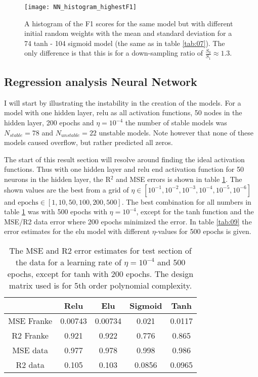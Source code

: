 \documentclass[uio,jmp,amsmath,amssymb,reprint,nofootinbib]{revtex4-1}
\numberwithin{equation}{section}
\begin{document}
\begin{figure}[H]
    \centering
    \texttt{[image: NN\_histogram\_highestF1]}
    \caption{A histogram of the F1 scores for the same model but with different initial random weights with the mean and standard deviation for a 74 tanh - 104 sigmoid model (the same as in table \ref{tab:07}). The only difference is that this is for a down-sampling ratio of \(\frac{S_0}{S_1}\approx 1.3\).}
    \label{fig:10}
\end{figure}


\subsection{Regression analysis Neural Network}\label{sec:reg_NN}

I will start by illustrating the instability in the creation of the models. For a model with one hidden layer, relu as all activation functions, 50 nodes in the hidden layer, 200 epochs and \(\eta = 10^{-4}\) the number of stable models was \(N_{stable} = 78\) and \(N_{unstable} = 22\) unstable models. Note however that none of these models caused overflow, but rather predicted all zeros.

The start of this result section will resolve around finding the ideal activation functions. Thus with one hidden layer and relu end activation function for 50 neurons in the hidden layer, the R\(^2\) and MSE errors is shown in table \ref{tab:08}. The shown values are the best from a grid of \(\eta \in [10^{-1}, 10^{-2}, 10^{-3}, 10^{-4}, 10^{-5}, 10^{-6}]\) and \(\text{epochs} \in [1, 10, 50, 100, 200, 500]\). The best combination for all numbers in table \ref{tab:08} was with 500 epochs with \(\eta = 10^{-4}\), except for the tanh function and the MSE/R2 data error where 200 epochs minimized the error. In table \ref{tab:09} the error estimates for the elu model with different \(\eta\)-values for 500 epochs is given.


\begin{table}[H]
\caption{The MSE and R2 error estimates for test section of the data for a learning rate of \(\eta = 10^{-4}\) and 500 epochs, except for tanh with 200 epochs. The design matrix used is for 5th order polynomial complexity.}
\begin{tabular}{|c|c|c|c|c|}\hline
 & Relu & Elu & Sigmoid & Tanh \\ \hline
MSE Franke & 0.00743 & 0.00734 & 0.021 & 0.0117 \\ \hline
R2 Franke & 0.921 & 0.922 & 0.776 & 0.865 \\ \hline
MSE data & 0.977 & 0.978 & 0.998 & 0.986 \\ \hline
R2 data & 0.105 & 0.103 & 0.0856 & 0.0965 \\ \hline
\end{tabular}
\label{tab:08}
\end{table}
\end{document}
